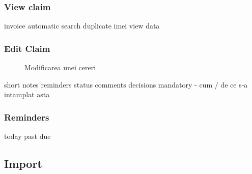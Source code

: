		\subsubsection{View claim}
			invoice automatic search
			duplicate imei
			view data
		\subsubsection{Edit Claim}

		\begin{figure}
			\centering
			\caption{Modificarea unei cereri}
		\end{figure}
				short notes
				reminders
				status
				comments
				decisions mandatory - cum / de ce s-a intamplat asta
		\subsubsection{Reminders}
				today
				past due
	\subsection{Import}
